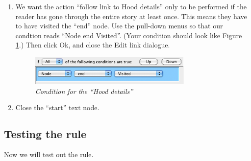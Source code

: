 \documentclass{article}
\begin{document}
\begin{enumerate}
\item We want the action ``follow link to Hood details'' only to be performed if
the reader has gone through the entire story at least once. This means they have
to have visited the ``end'' node. Use the pull-down menus so that our condtion
reads ``Node end Visited''. (Your condition should look like Figure
\ref{fig:condition_hood_details}.) Then click Ok, and close the Edit link
dialogue.

\begin{figure}[ht]
  \centering
  \includegraphics[width=8cm]{images/hypedyn-tutorial-1-figure-14}
  \caption{\textit{Condition for the ``Hood details''}}
  \label{fig:condition_hood_details}
\end{figure} 

\item Close the ``start'' text node.
\end{enumerate}

\subsection{Testing the rule}

Now we will test out the rule.
\end{document}

